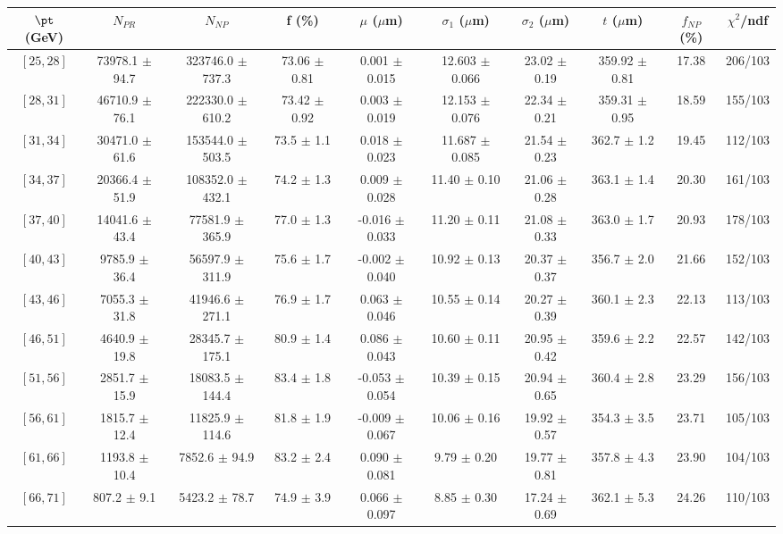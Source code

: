 \begin{tabular}{c||c|c|c|c|c|c|c||c|c}
$\pt$ (GeV) & $N_{PR}$ & $N_{NP}$ & f (\%) & $\mu$ ($\mu$m) & $\sigma_1$ ($\mu$m) & $\sigma_2$ ($\mu$m)  & $t$ ($\mu$m) & $f_{NP}$ (\%) & $\chi^2$/ndf \\
\hline
$[25, 28]$ & 73978.1 $\pm$ 94.7 & 323746.0 $\pm$ 737.3 & 73.06 $\pm$ 0.81 & 0.001 $\pm$ 0.015 & 12.603 $\pm$ 0.066 & 23.02 $\pm$ 0.19 & 359.92 $\pm$ 0.81 & 17.38 & 206/103\\
$[28, 31]$ & 46710.9 $\pm$ 76.1 & 222330.0 $\pm$ 610.2 & 73.42 $\pm$ 0.92 & 0.003 $\pm$ 0.019 & 12.153 $\pm$ 0.076 & 22.34 $\pm$ 0.21 & 359.31 $\pm$ 0.95 & 18.59 & 155/103\\
$[31, 34]$ & 30471.0 $\pm$ 61.6 & 153544.0 $\pm$ 503.5 & 73.5 $\pm$ 1.1 & 0.018 $\pm$ 0.023 & 11.687 $\pm$ 0.085 & 21.54 $\pm$ 0.23 & 362.7 $\pm$ 1.2 & 19.45 & 112/103\\
$[34, 37]$ & 20366.4 $\pm$ 51.9 & 108352.0 $\pm$ 432.1 & 74.2 $\pm$ 1.3 & 0.009 $\pm$ 0.028 & 11.40 $\pm$ 0.10 & 21.06 $\pm$ 0.28 & 363.1 $\pm$ 1.4 & 20.30 & 161/103\\
$[37, 40]$ & 14041.6 $\pm$ 43.4 & 77581.9 $\pm$ 365.9 & 77.0 $\pm$ 1.3 & -0.016 $\pm$ 0.033 & 11.20 $\pm$ 0.11 & 21.08 $\pm$ 0.33 & 363.0 $\pm$ 1.7 & 20.93 & 178/103\\
$[40, 43]$ & 9785.9 $\pm$ 36.4 & 56597.9 $\pm$ 311.9 & 75.6 $\pm$ 1.7 & -0.002 $\pm$ 0.040 & 10.92 $\pm$ 0.13 & 20.37 $\pm$ 0.37 & 356.7 $\pm$ 2.0 & 21.66 & 152/103\\
$[43, 46]$ & 7055.3 $\pm$ 31.8 & 41946.6 $\pm$ 271.1 & 76.9 $\pm$ 1.7 & 0.063 $\pm$ 0.046 & 10.55 $\pm$ 0.14 & 20.27 $\pm$ 0.39 & 360.1 $\pm$ 2.3 & 22.13 & 113/103\\
$[46, 51]$ & 4640.9 $\pm$ 19.8 & 28345.7 $\pm$ 175.1 & 80.9 $\pm$ 1.4 & 0.086 $\pm$ 0.043 & 10.60 $\pm$ 0.11 & 20.95 $\pm$ 0.42 & 359.6 $\pm$ 2.2 & 22.57 & 142/103\\
$[51, 56]$ & 2851.7 $\pm$ 15.9 & 18083.5 $\pm$ 144.4 & 83.4 $\pm$ 1.8 & -0.053 $\pm$ 0.054 & 10.39 $\pm$ 0.15 & 20.94 $\pm$ 0.65 & 360.4 $\pm$ 2.8 & 23.29 & 156/103\\
$[56, 61]$ & 1815.7 $\pm$ 12.4 & 11825.9 $\pm$ 114.6 & 81.8 $\pm$ 1.9 & -0.009 $\pm$ 0.067 & 10.06 $\pm$ 0.16 & 19.92 $\pm$ 0.57 & 354.3 $\pm$ 3.5 & 23.71 & 105/103\\
$[61, 66]$ & 1193.8 $\pm$ 10.4 & 7852.6 $\pm$ 94.9 & 83.2 $\pm$ 2.4 & 0.090 $\pm$ 0.081 & 9.79 $\pm$ 0.20 & 19.77 $\pm$ 0.81 & 357.8 $\pm$ 4.3 & 23.90 & 104/103\\
$[66, 71]$ & 807.2 $\pm$ 9.1 & 5423.2 $\pm$ 78.7 & 74.9 $\pm$ 3.9 & 0.066 $\pm$ 0.097 & 8.85 $\pm$ 0.30 & 17.24 $\pm$ 0.69 & 362.1 $\pm$ 5.3 & 24.26 & 110/103\\

\end{tabular}
